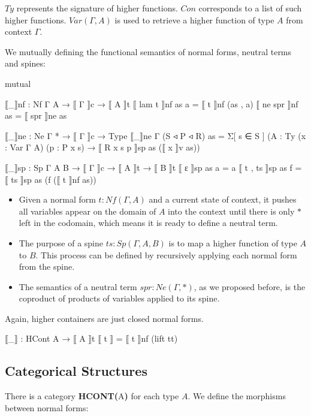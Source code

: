 $Ty$ represents the signature of higher functions. $Con$ corresponds to a list of such higher functions. $Var(\Gamma,A)$ is used to retrieve a higher function of type $A$ from context $\Gamma$.

We mutually defining the functional semantics of normal forms, neutral terms and spines:

\begin{code}[hide]
mutual
\end{code}

\begin{code}
  ⟦_⟧nf : Nf Γ A → ⟦ Γ ⟧c → ⟦ A ⟧t
  ⟦ lam t ⟧nf as a = ⟦ t ⟧nf (as , a)
  ⟦ ne spr ⟧nf as = ⟦ spr ⟧ne as

  ⟦_⟧ne : Ne Γ * → ⟦ Γ ⟧c → Type
  ⟦_⟧ne {Γ} (S ◃ P ◃ R) as =
    Σ[ s ∈ S ] ({A : Ty} (x : Var Γ A) (p : P x s)
      → ⟦ R x s p ⟧sp as (⟦ x ⟧v as))

  ⟦_⟧sp : Sp Γ A B → ⟦ Γ ⟧c → ⟦ A ⟧t → ⟦ B ⟧t
  ⟦ ε ⟧sp as a = a
  ⟦ t , ts ⟧sp as f = ⟦ ts ⟧sp as (f (⟦ t ⟧nf as))
\end{code}

\begin{itemize}
  \item{Given a normal form $t : Nf(\Gamma,A)$ and a current state of context, it pushes all variables appear on the domain of $A$ into the context until there is only $*$ left in the codomain, which means it is ready to define a neutral term.}

  \item{The purpose of a spine $ts : Sp(\Gamma,A,B)$ is to map a higher function of type $A$ to $B$. This process can be defined by recursively applying each normal form from the spine.}

  \item{The semantics of a neutral term $spr : Ne(\Gamma,*)$, as we proposed before, is the coproduct of products of variables applied to its spine.}
\end{itemize}

Again, higher containers are just closed normal forms.

\begin{code}
⟦_⟧ : HCont A → ⟦ A ⟧t
⟦ t ⟧ = ⟦ t ⟧nf (lift tt)
\end{code}

\subsection{Categorical Structures}

There is a category \textbf{HCONT(}A\textbf{)} for each type $A$. We define the morphisms between normal forms:

